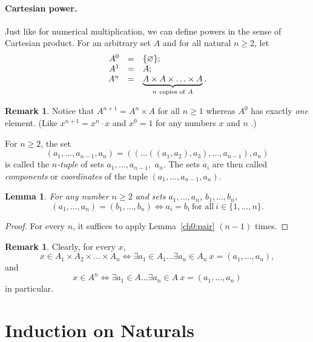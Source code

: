 \documentclass[12pt,notitlepage]{article}
\theoremstyle{plain}
\newtheorem{lemma}[thm]{Lemma}
\theoremstyle{definition}
\newtheorem{rem}[thm]{Remark}
\theoremstyle{plain}
\newcommand{\N}{\mathbb{N}}
\newcommand{\void}{\varnothing}
\newcommand{\1}{\mathbf{1}}
\newcommand{\0}{\mathbf{0}}
\newcommand{\mcomm}[1]{}
\begin{document}
\paragraph{Cartesian power.} Just like for numerical multiplication, we can define powers in the sense of Cartesian product. For an arbitrary set $A$ and for all natural $n \geq 2$, let
$$
\begin{array}{rcl}
A^0 &=& \{\void\};\\
A^1 &=& A;\\
A^n &=& \underbrace{A \times A \times \ldots \times A}_{n\ \mbox{\scriptsize copies of}\ A}.
\end{array}
$$
\mcomm{We do not want any explicit recursion here since we have no Replacement axioms to make it rigorous. We prefer this schematic definition for $n$ running over $\N$.}
\begin{rem}\label{ch0:cart_pow}
Notice that $A^{n+1} = A^n \times A$ for all $n \geq 1$ whereas $A^0$ has exactly \emph{one} element. (Like $x^{n+1} = x^n \cdot x$ and $x^0 = 1$ for any numbers $x$ and $n$ .)
\end{rem}

For $n \geq 2$, the set
$$(a_1,\ldots, a_{n-1}, a_{n}) = ((\ldots ((a_1,a_2), a_3), \ldots, a_{n-1}), a_{n})$$
is called the \emph{$n$-tuple} of sets $a_1, \ldots, a_{n-1},$ $a_{n}$. The sets $a_i$ are then called \emph{components} or \emph{coordinates} of the tuple $(a_1,\ldots, a_{n-1}, a_{n})$.
\begin{lemma}\label{L2:l_tuple_id}
For any number $n \geq 2$ and sets $a_1, \ldots, a_{n}$, $b_1, \ldots, b_{n}$,
$$(a_1,\ldots, a_{n}) = (b_1,\ldots, b_{n}) \iff a_i = b_i\ \mbox{for all}\ i \in \{1,\ldots,n\}.$$
\end{lemma}
\begin{proof}
For every $n$, it suffices to apply Lemma~\ref{ch0:pair} $(n-1)$ times.
\end{proof}

\begin{rem}
Clearly, for every $x$,
$$x \in A_1 \times A_2 \times \ldots \times A_n \iff \exists a_1 \in A_1 \ldots \exists a_n \in A_n\ x = (a_1,\ldots,a_n),$$
and
$$x \in A^n \iff \exists a_1 \in A \ldots \exists a_n \in A\ x = (a_1,\ldots,a_n)$$
in particular.
\end{rem}

\section{Induction on Naturals}
\mcomm{The main goal of this section is to introduce three popular forms of induction principle for $\N$: the most common one, the `Strong' (or `Well-founded' or `Noetherian') induction, and the Least Number principles. Then we prove that all three principles are equivalent to each other. The Instructor should encourage the students to apply these principles as formally as it is reasonably possible at their first steps.}
\end{document}
